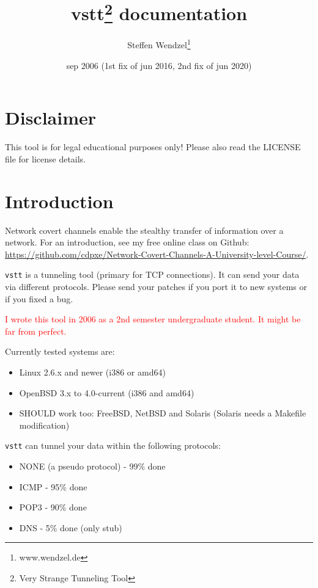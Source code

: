 \documentclass[10pt,a4paper]{article}
\author{Steffen Wendzel\footnote{www.wendzel.de}}
\title{vstt\footnote{Very Strange Tunneling Tool} documentation}
\date{sep 2006 (1st fix of jun 2016, 2nd fix of jun 2020)}
\makeatletter
\def\maketitle{%
  \null
  \thispagestyle{empty}%
  \vfill
  \begin{center}\leavevmode
    \normalfont
    {\LARGE\raggedleft \@author\par}%
    \hrulefill\par
    {\huge\raggedright \textbf{\@title}\par}%
    \vskip 1cm
  \end{center}%
  \vfill
  \vfill
  \null
  \cleardoublepage
}
\makeatother
\begin{document}
\maketitle
\tableofcontents
\newpage

\section{Disclaimer}

This tool is for legal educational purposes only! Please also read the LICENSE
file for license details.


\section{Introduction}

Network covert channels enable the stealthy transfer of information over a network. For an introduction, see my free online class on Github: \url{https://github.com/cdpxe/Network-Covert-Channels-A-University-level-Course/}.

\texttt{vstt} is a tunneling tool (primary for TCP connections). It can send
your data via different protocols. Please send your patches if you
port it to new systems or if you fixed a bug.

\textcolor{red}{I wrote this tool in 2006 as a 2nd semester undergraduate student. It might be far from perfect.}

Currently tested systems are:

\begin{itemize}
	\item Linux 2.6.x and newer (i386 or amd64)
	\item OpenBSD 3.x to 4.0-current (i386 and amd64)
	\item SHOULD work too: FreeBSD, NetBSD and Solaris (Solaris needs a Makefile modification)
\end{itemize}

\texttt{vstt} can tunnel your data within the following protocols:

\begin{itemize}
	\item NONE (a pseudo protocol) - 99\% done
	\item ICMP - 95\% done
	\item POP3 - 90\% done
	\item DNS - 5\% done (only stub)
\end{itemize}
\end{document}
